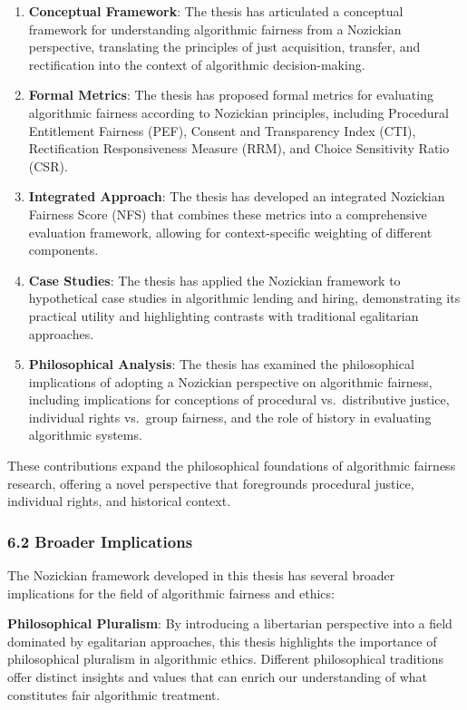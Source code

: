 \begin{enumerate}
\def\labelenumi{\arabic{enumi}.}
\item
  \textbf{Conceptual Framework}: The thesis has articulated a conceptual
  framework for understanding algorithmic fairness from a Nozickian
  perspective, translating the principles of just acquisition, transfer,
  and rectification into the context of algorithmic decision-making.
\item
  \textbf{Formal Metrics}: The thesis has proposed formal metrics for
  evaluating algorithmic fairness according to Nozickian principles,
  including Procedural Entitlement Fairness (PEF), Consent and
  Transparency Index (CTI), Rectification Responsiveness Measure (RRM),
  and Choice Sensitivity Ratio (CSR).
\item
  \textbf{Integrated Approach}: The thesis has developed an integrated
  Nozickian Fairness Score (NFS) that combines these metrics into a
  comprehensive evaluation framework, allowing for context-specific
  weighting of different components.
\item
  \textbf{Case Studies}: The thesis has applied the Nozickian framework
  to hypothetical case studies in algorithmic lending and hiring,
  demonstrating its practical utility and highlighting contrasts with
  traditional egalitarian approaches.
\item
  \textbf{Philosophical Analysis}: The thesis has examined the
  philosophical implications of adopting a Nozickian perspective on
  algorithmic fairness, including implications for conceptions of
  procedural vs.~distributive justice, individual rights vs.~group
  fairness, and the role of history in evaluating algorithmic systems.
\end{enumerate}

These contributions expand the philosophical foundations of algorithmic
fairness research, offering a novel perspective that foregrounds
procedural justice, individual rights, and historical context.

\subsubsection{6.2 Broader Implications}\label{broader-implications}

The Nozickian framework developed in this thesis has several broader
implications for the field of algorithmic fairness and ethics:

\textbf{Philosophical Pluralism}: By introducing a libertarian
perspective into a field dominated by egalitarian approaches, this
thesis highlights the importance of philosophical pluralism in
algorithmic ethics. Different philosophical traditions offer distinct
insights and values that can enrich our understanding of what
constitutes fair algorithmic treatment.

